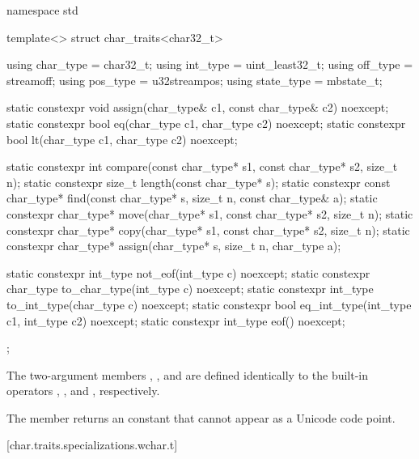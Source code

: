 %
\begin{codeblock}
namespace std {
  template<> struct char_traits<char32_t> {
    using char_type  = char32_t;
    using int_type   = uint_least32_t;
    using off_type   = streamoff;
    using pos_type   = u32streampos;
    using state_type = mbstate_t;

    static constexpr void assign(char_type& c1, const char_type& c2) noexcept;
    static constexpr bool eq(char_type c1, char_type c2) noexcept;
    static constexpr bool lt(char_type c1, char_type c2) noexcept;

    static constexpr int compare(const char_type* s1, const char_type* s2, size_t n);
    static constexpr size_t length(const char_type* s);
    static constexpr const char_type* find(const char_type* s, size_t n,
                                           const char_type& a);
    static constexpr char_type* move(char_type* s1, const char_type* s2, size_t n);
    static constexpr char_type* copy(char_type* s1, const char_type* s2, size_t n);
    static constexpr char_type* assign(char_type* s, size_t n, char_type a);

    static constexpr int_type not_eof(int_type c) noexcept;
    static constexpr char_type to_char_type(int_type c) noexcept;
    static constexpr int_type to_int_type(char_type c) noexcept;
    static constexpr bool eq_int_type(int_type c1, int_type c2) noexcept;
    static constexpr int_type eof() noexcept;
  };
}
\end{codeblock}


\pnum
The two-argument members ,
, and  are defined identically to
the built-in operators \tcode{=}, \tcode{==}, and
\tcode{<}, respectively.

\pnum
The member  returns an
 constant that cannot appear as a Unicode
code point.

[char.traits.specializations.wchar.t]{}

